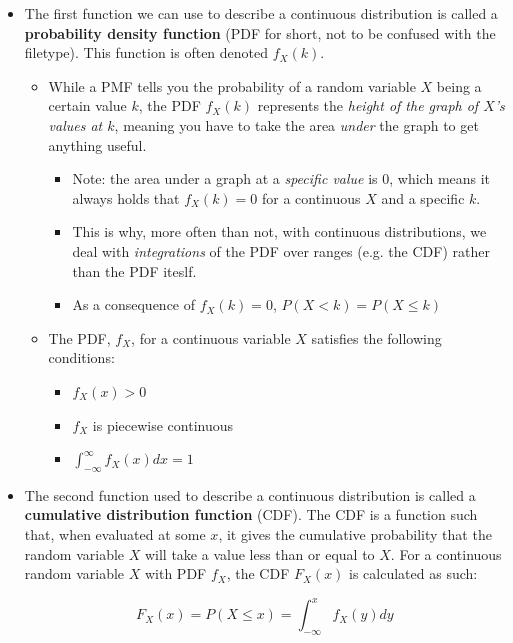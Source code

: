 \documentclass[12pt]{article}
\begin{document}
\begin{itemize}
	\item The first function we can use to describe a continuous distribution
	      is called a \textbf{probability density function} (PDF for short, not
	      to be confused with the filetype). This function is often denoted $f_X(k)$.
	      \begin{itemize}
		      \item While a PMF tells you the probability of a random variable $X$ being a certain value $k$, the PDF $f_X(k)$ represents the \emph{height of the graph of $X$'s values at $k$}, meaning you have to take the area \emph{under} the graph to get anything useful.
		            \begin{itemize}
			            \item Note: the area under a graph at a
			                  \emph{specific value} is $0$, which means it
			                  always holds that $f_X(k) = 0$  for a
			                  continuous $X$ and a specific $k$.
			            \item This is why, more often than not, with continuous distributions, we deal with \emph{integrations} of the PDF over ranges (e.g. the CDF) rather than the PDF iteslf.
			            \item As a consequence of $f_X(k) = 0$, $P(X < k) = P(X \leq k)$
		            \end{itemize}
		      \item The PDF,
		            $f_X$, for a continuous variable $X$ satisfies the following conditions:
		            \begin{itemize}
			            \item $f_X(x) > 0$
			            \item $f_X$ is piecewise continuous
			            \item $\int_{-\infty}^{\infty} f_X(x) dx = 1$
		            \end{itemize}
	      \end{itemize}

	\item The second function used to describe a continuous distribution is called a
	      \textbf{cumulative distribution function} (CDF). The CDF is a
	      function such that, when evaluated at some $x$, it gives the
	      cumulative probability that the random variable $X$ will take a value
	      less than or equal to $X$. For a continuous random variable $X$ with
	      PDF $f_X$, the CDF $F_X(x)$ is calculated as such:

	      \[ F_X(x) = P(X \leq x) =
		      \int_{-\infty}^{x}f_X(y)dy
	      \]
\end{itemize}
\end{document}
